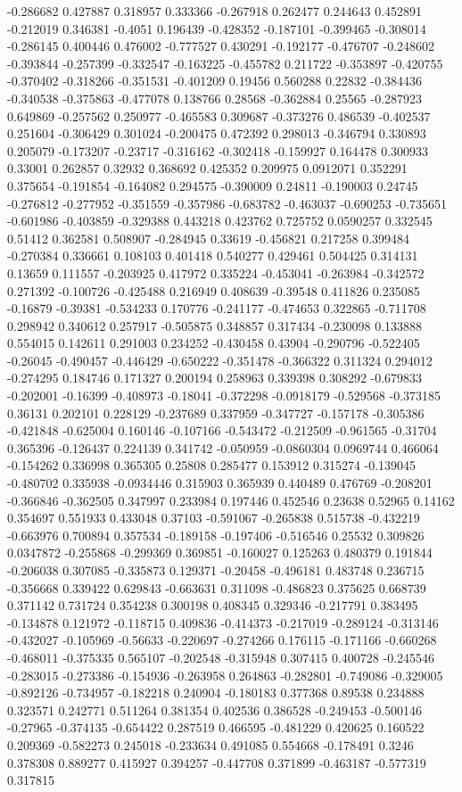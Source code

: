 -0.286682 0.427887 0.318957 0.333366 -0.267918 0.262477 0.244643 0.452891 -0.212019 0.346381 -0.4051 0.196439 -0.428352 -0.187101 -0.399465 -0.308014 -0.286145 0.400446 0.476002 -0.777527 0.430291 -0.192177 -0.476707 -0.248602 -0.393844 -0.257399 -0.332547 -0.163225 -0.455782 0.211722 -0.353897 -0.420755 -0.370402 -0.318266 -0.351531 -0.401209 0.19456 0.560288 0.22832 -0.384436 -0.340538 -0.375863 -0.477078 0.138766 0.28568 -0.362884 0.25565 -0.287923 0.649869 -0.257562 0.250977 -0.465583 0.309687 -0.373276 0.486539 -0.402537 0.251604 -0.306429 0.301024 -0.200475 0.472392 0.298013 -0.346794 0.330893 0.205079 -0.173207 -0.23717 -0.316162 -0.302418 -0.159927 0.164478 0.300933 0.33001 0.262857 0.32932 0.368692 0.425352 0.209975 0.0912071 0.352291 0.375654 -0.191854 -0.164082 0.294575 -0.390009 0.24811 -0.190003 0.24745 -0.276812 -0.277952 -0.351559 -0.357986 -0.683782 -0.463037 -0.690253 -0.735651 -0.601986 -0.403859 -0.329388 0.443218 0.423762 0.725752 0.0590257 0.332545 0.51412 0.362581 0.508907 -0.284945 0.33619 -0.456821 0.217258 0.399484 -0.270384 0.336661 0.108103 0.401418 0.540277 0.429461 0.504425 0.314131 0.13659 0.111557 -0.203925 0.417972 0.335224 -0.453041 -0.263984 -0.342572 0.271392 -0.100726 -0.425488 0.216949 0.408639 -0.39548 0.411826 0.235085 -0.16879 -0.39381 -0.534233 0.170776 -0.241177 -0.474653 0.322865 -0.711708 0.298942 0.340612 0.257917 -0.505875 0.348857 0.317434 -0.230098 0.133888 0.554015 0.142611 0.291003 0.234252 -0.430458 0.43904 -0.290796 -0.522405 -0.26045 -0.490457 -0.446429 -0.650222 -0.351478 -0.366322 0.311324 0.294012 -0.274295 0.184746 0.171327 0.200194 0.258963 0.339398 0.308292 -0.679833 -0.202001 -0.16399 -0.408973 -0.18041 -0.372298 -0.0918179 -0.529568 -0.373185 0.36131 0.202101 0.228129 -0.237689 0.337959 -0.347727 -0.157178 -0.305386 -0.421848 -0.625004 0.160146 -0.107166 -0.543472 -0.212509 -0.961565 -0.31704 0.365396 -0.126437 0.224139 0.341742 -0.050959 -0.0860304 0.0969744 0.466064 -0.154262 0.336998 0.365305 0.25808 0.285477 0.153912 0.315274 -0.139045 -0.480702 0.335938 -0.0934446 0.315903 0.365939 0.440489 0.476769 -0.208201 -0.366846 -0.362505 0.347997 0.233984 0.197446 0.452546 0.23638 0.52965 0.14162 0.354697 0.551933 0.433048 0.37103 -0.591067 -0.265838 0.515738 -0.432219 -0.663976 0.700894 0.357534 -0.189158 -0.197406 -0.516546 0.25532 0.309826 0.0347872 -0.255868 -0.299369 0.369851 -0.160027 0.125263 0.480379 0.191844 -0.206038 0.307085 -0.335873 0.129371 -0.20458 -0.496181 0.483748 0.236715 -0.356668 0.339422 0.629843 -0.663631 0.311098 -0.486823 0.375625 0.668739 0.371142 0.731724 0.354238 0.300198 0.408345 0.329346 -0.217791 0.383495 -0.134878 0.121972 -0.118715 0.409836 -0.414373 -0.217019 -0.289124 -0.313146 -0.432027 -0.105969 -0.56633 -0.220697 -0.274266 0.176115 -0.171166 -0.660268 -0.468011 -0.375335 0.565107 -0.202548 -0.315948 0.307415 0.400728 -0.245546 -0.283015 -0.273386 -0.154936 -0.263958 0.264863 -0.282801 -0.749086 -0.329005 -0.892126 -0.734957 -0.182218 0.240904 -0.180183 0.377368 0.89538 0.234888 0.323571 0.242771 0.511264 0.381354 0.402536 0.386528 -0.249453 -0.500146 -0.27965 -0.374135 -0.654422 0.287519 0.466595 -0.481229 0.420625 0.160522 0.209369 -0.582273 0.245018 -0.233634 0.491085 0.554668 -0.178491 0.3246 0.378308 0.889277 0.415927 0.394257 -0.447708 0.371899 -0.463187 -0.577319 0.317815 